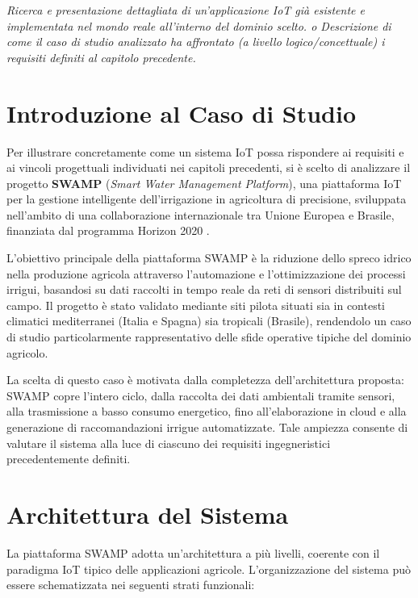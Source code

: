 \begin{center}
	\textit{Ricerca e presentazione dettagliata di un'applicazione IoT già esistente e 
		implementata nel mondo reale all'interno del dominio scelto. 
		o Descrizione di come il caso di studio analizzato ha affrontato (a livello 
		logico/concettuale) i requisiti definiti al capitolo precedente. }
\end{center}

\section{Introduzione al Caso di Studio}

Per illustrare concretamente come un sistema IoT possa rispondere ai requisiti e ai vincoli progettuali individuati nei capitoli precedenti, si è scelto di analizzare il progetto \textbf{SWAMP} (\textit{Smart Water Management Platform}), una piattaforma IoT per la gestione intelligente dell'irrigazione in agricoltura di precisione, sviluppata nell'ambito di una collaborazione internazionale tra Unione Europea e Brasile, finanziata dal programma Horizon 2020 \cite{kamienski2019swamp}.

L'obiettivo principale della piattaforma SWAMP è la riduzione dello spreco idrico nella produzione agricola attraverso l'automazione e l'ottimizzazione dei processi irrigui, basandosi su dati raccolti in tempo reale da reti di sensori distribuiti sul campo. Il progetto è stato validato mediante siti pilota situati sia in contesti climatici mediterranei (Italia e Spagna) sia tropicali (Brasile), rendendolo un caso di studio particolarmente rappresentativo delle sfide operative tipiche del dominio agricolo.

La scelta di questo caso è motivata dalla completezza dell'architettura proposta: SWAMP copre l'intero ciclo, dalla raccolta dei dati ambientali tramite sensori, alla trasmissione a basso consumo energetico, fino all'elaborazione in cloud e alla generazione di raccomandazioni irrigue automatizzate. Tale ampiezza consente di valutare il sistema alla luce di ciascuno dei requisiti ingegneristici precedentemente definiti.


\section{Architettura del Sistema}

La piattaforma SWAMP adotta un'architettura a più livelli, coerente con il paradigma IoT tipico delle applicazioni agricole. L'organizzazione del sistema può essere schematizzata nei seguenti strati funzionali:

